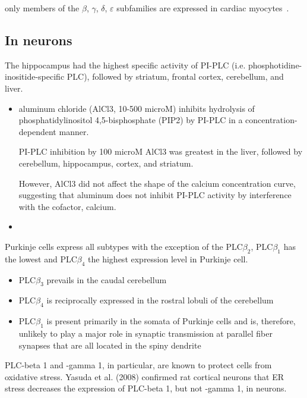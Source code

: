 only members of the $\beta$, $\gamma$, $\delta$, $\varepsilon$
subfamilies are expressed in cardiac myocytes~\citep{berridge2003csd,
kockskamper2008ip3}.

\subsection{In neurons}
\label{sec:PLC-in-brain}


The hippocampus had the highest specific activity of PI-PLC (i.e.
phosphotidine-inositide-specific PLC), followed by striatum, frontal cortex,
cerebellum, and liver.
\begin{itemize}
  \item   aluminum chloride (AlCl3, 10-500 microM) inhibits hydrolysis of
  phosphatidylinositol 4,5-bisphosphate (PIP2) by PI-PLC in a
  concentration-dependent manner. 
  
  PI-PLC inhibition by 100 microM AlCl3 was greatest in the liver, followed by
  cerebellum, hippocampus, cortex, and striatum.

However, AlCl3 did not affect the shape of the calcium concentration curve,
suggesting that aluminum does not inhibit PI-PLC activity by interference with
the cofactor, calcium.
  
  \item 
\end{itemize}

Purkinje cells express all subtypes with the exception of the PLC$\beta_2$,
PLC$\beta_1$ has the lowest and PLC$\beta_4$ the highest expression level in
Purkinje cell.
\begin{itemize}
  \item PLC$\beta_3$ prevails in the caudal cerebellum
  \item PLC$\beta_4$ is reciprocally expressed in the rostral lobuli of the
  cerebellum
  
  \item PLC$\beta_1$ is present primarily in the somata of Purkinje cells and
  is, therefore, unlikely to play a major role in synaptic transmission at
  parallel fiber synapses that are all located in the spiny dendrite
\end{itemize}

PLC-beta 1 and -gamma 1, in particular, are known to protect cells from
oxidative stress.
Yasuda et al. (2008) confirmed rat cortical neurons that ER stress decreases the
expression of PLC-beta 1, but not -gamma 1, in neurons.

